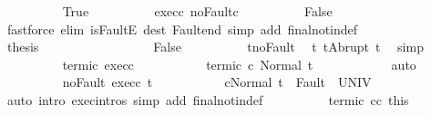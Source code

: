 \begin{isabellebody}
\ \ \ \ \ \ \ \ \isamarkupfalse%
\ True\isanewline
\ \ \ \ \ \ \ \ \isamarkupfalse%
\ exec{\isacharunderscore}c{}{\isacharprime}\ noFault{\isacharunderscore}c{}{\isacharprime}\isanewline
\ \ \ \ \ \ \ \ \isamarkupfalse%
\ False\isanewline
\ \ \ \ \ \ \ \ \ \ \isamarkupfalse%
\ {\isacharparenleft}fastforce\ elim{\isacharcolon}\ isFaultE\ dest{\isacharcolon}\ Fault{\isacharunderscore}end\ simp\ add{\isacharcolon}\ final{\isacharunderscore}notin{\isacharunderscore}def{\isacharparenright}\isanewline
\ \ \ \ \ \ \ \ \isamarkupfalse%
\ {\isacharquery}thesis\ \isacommand{{\isachardot}{\isachardot}}\isamarkupfalse%
\isanewline
\ \ \ \ \ \ \isamarkupfalse%
\isanewline
\ \ \ \ \ \ \ \ \isamarkupfalse%
\ False\isanewline
\ \ \ \ \ \ \ \ \isamarkupfalse%
\ t{\isacharprime}{\isacharunderscore}noFault\ \isamarkupfalse%
\ t{\isacharprime}{\isacharcolon}\ {\isachardoublequoteopen}t{\isacharprime}{\isacharequal}Abrupt\ t{\isachardoublequoteclose}\ \isamarkupfalse%
\ simp\isanewline
\ \ \ \ \ \ \ \ \isamarkupfalse%
\ termi{\isacharunderscore}c{}{\isacharprime}\ exec{\isacharunderscore}c{}{\isacharprime}\ \isanewline
\ \ \ \ \ \ \ \ \isamarkupfalse%
\ termi{\isacharunderscore}c{}{\isacharprime}{\isacharcolon}\ {\isachardoublequoteopen}{\isasymGamma}{\isasymturnstile}c{}{\isacharprime}{\isasymdown}\ Normal\ t{\isachardoublequoteclose}\isanewline
\ \ \ \ \ \ \ \ \ \ \isamarkupfalse%
\ auto\isanewline
\ \ \ \ \ \ \ \ \isamarkupfalse%
\ noFault\ exec{\isacharunderscore}c{}{\isacharprime}\ t{\isacharprime}\ \isanewline
\ \ \ \ \ \ \ \ \isamarkupfalse%
\ {\isachardoublequoteopen}{\isasymGamma}{\isasymturnstile}{\isasymlangle}c{}{\isacharprime}{\isacharcomma}Normal\ t\ {\isasymrangle}\ {\isasymRightarrow}{\isasymnotin}Fault\ {\isacharbackquote}\ UNIV{\isachardoublequoteclose}\isanewline
\ \ \ \ \ \ \ \ \ \ \isamarkupfalse%
\ {\isacharparenleft}auto\ intro{\isacharcolon}\ exec{\isachardot}intros\ simp\ add{\isacharcolon}\ final{\isacharunderscore}notin{\isacharunderscore}def{\isacharparenright}\isanewline
\ \ \ \ \ \ \ \ \isamarkupfalse%
\ termi{\isacharunderscore}c{}{\isacharprime}\ c{}{\isacharunderscore}c{}{\isacharprime}\ this\isanewline
\ \ \ \ \ \ \ \ \isamarkupfalse%

\end{isabellebody}
